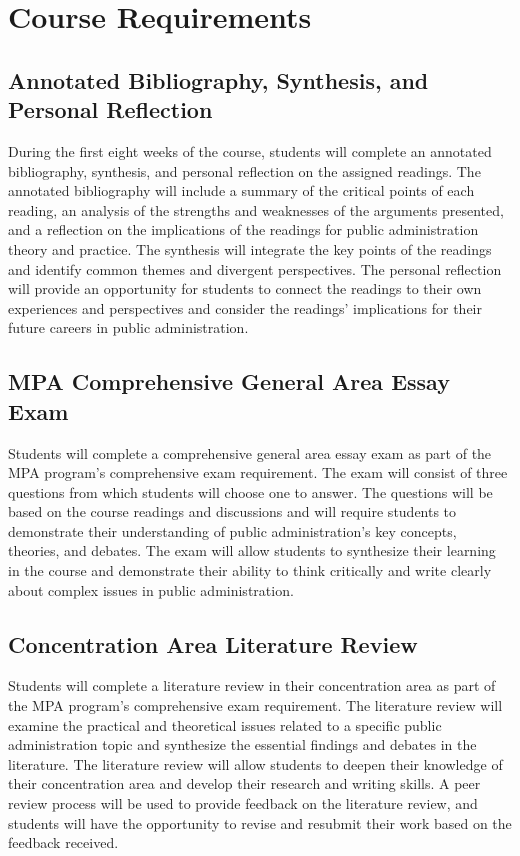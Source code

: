 \documentclass[12pt, letterpaper]{article}
\begin{document}
\section{Course Requirements}

\subsection*{Annotated Bibliography, Synthesis, and Personal Reflection}
During the first eight weeks of the course, students will complete an annotated bibliography, synthesis, and personal reflection on the assigned readings. The annotated bibliography will include a summary of the critical points of each reading, an analysis of the strengths and weaknesses of the arguments presented, and a reflection on the implications of the readings for public administration theory and practice. The synthesis will integrate the key points of the readings and identify common themes and divergent perspectives. The personal reflection will provide an opportunity for students to connect the readings to their own experiences and perspectives and consider the readings' implications for their future careers in public administration.

\subsection*{MPA Comprehensive General Area Essay Exam}

Students will complete a comprehensive general area essay exam as part of the MPA program’s comprehensive exam requirement. The exam will consist of three questions from which students will choose one to answer. The questions will be based on the course readings and discussions and will require students to demonstrate their understanding of public administration's key concepts, theories, and debates. The exam will allow students to synthesize their learning in the course and demonstrate their ability to think critically and write clearly about complex issues in public administration.

\subsection*{Concentration Area Literature Review}

Students will complete a literature review in their concentration area as part of the MPA program’s comprehensive exam requirement. The literature review will examine the practical and theoretical issues related to a specific public administration topic and synthesize the essential findings and debates in the literature. The literature review will allow students to deepen their knowledge of their concentration area and develop their research and writing skills. A peer review process will be used to provide feedback on the literature review, and students will have the opportunity to revise and resubmit their work based on the feedback received.
\end{document}
